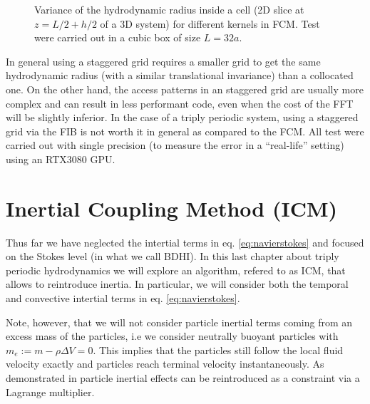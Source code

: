 \documentclass[ twoside,openright,titlepage,numbers=noenddot,%
headinclude,footinclude,cleardoublepage=empty,abstract=on,
BCOR=5mm,paper=a4,fontsize=11pt, dvipsnames
]{scrreprt}
\newcommand{\gpu}{\gls{GPU}\xspace}
\begin{document}
\begin{figure}
  \label{fig:ibm_gauss10pt}
  \caption{Variance of the hydrodynamic radius inside a cell (2D slice at $z=L/2+h/2$ of a 3D system) for different kernels in \gls{FCM}. Test were carried out in a cubic box of size $L=32a$.}
\end{figure}

In general using a staggered grid requires a smaller grid to get the same hydrodynamic radius (with a similar translational invariance) than a collocated one. On the other hand, the access patterns in an staggered grid are usually more complex and can result in less performant code, even when the cost of the FFT will be slightly inferior. In the case of a triply periodic system, using a staggered grid via the \gls{FIB} is not worth it in general as compared to the \gls{FCM}.
All test were carried out with single precision (to measure the error in a ``real-life'' setting) using an RTX3080 \gpu.



\section{Inertial Coupling Method (ICM)}\label{ch:icm}
Thus far we have neglected the intertial terms in eq. \eqref{eq:navierstokes} and focused on the Stokes level (in what we call \gls{BDHI}). In this last chapter about triply periodic hydrodynamics we will explore an algorithm, refered to as \gls{ICM}\cite{Balboa2014}, that allows to reintroduce inertia. In particular, we will consider both the temporal and convective intertial terms in eq. \eqref{eq:navierstokes}.

Note, however, that we will not consider particle inertial terms coming from an excess mass of the particles, i.e we consider neutrally buoyant particles with $m_e := m - \rho\Delta V = 0$. This implies that the particles still follow the local fluid velocity exactly and particles reach terminal velocity instantaneously. As demonstrated in \cite{Balboa2014} particle inertial effects can be reintroduced as a constraint via a Lagrange multiplier.
\end{document}
